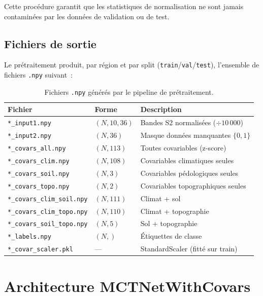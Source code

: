 Cette procédure garantit que les statistiques de normalisation ne sont jamais
contaminées par les données de validation ou de test.

\subsection{Fichiers de sortie}

Le prétraitement produit, par région et par split (\texttt{train}/\texttt{val}/\texttt{test}),
l'ensemble de fichiers \texttt{.npy} suivant~:

\begin{table}[H]
\centering
\begin{tabular}{lll}
\hline
\textbf{Fichier} & \textbf{Forme} & \textbf{Description} \\
\hline
\texttt{*\_input1.npy}             & $(N, 10, 36)$ & Bandes S2 normalisées ($\div 10\,000$) \\
\texttt{*\_input2.npy}             & $(N, 36)$     & Masque données manquantes $\{0,1\}$ \\
\texttt{*\_covars\_all.npy}        & $(N, 113)$    & Toutes covariables (z-score) \\
\texttt{*\_covars\_clim.npy}       & $(N, 108)$    & Covariables climatiques seules \\
\texttt{*\_covars\_soil.npy}       & $(N, 3)$      & Covariables pédologiques seules \\
\texttt{*\_covars\_topo.npy}       & $(N, 2)$      & Covariables topographiques seules \\
\texttt{*\_covars\_clim\_soil.npy} & $(N, 111)$    & Climat + sol \\
\texttt{*\_covars\_clim\_topo.npy} & $(N, 110)$    & Climat + topographie \\
\texttt{*\_covars\_soil\_topo.npy} & $(N, 5)$      & Sol + topographie \\
\texttt{*\_labels.npy}             & $(N,)$        & Étiquettes de classe \\
\texttt{*\_covar\_scaler.pkl}      & —             & StandardScaler (fitté sur train) \\
\hline
\end{tabular}
\caption{Fichiers \texttt{.npy} générés par le pipeline de prétraitement.}
\label{tab:npy_files}
\end{table}

\section{Architecture MCTNetWithCovars}

